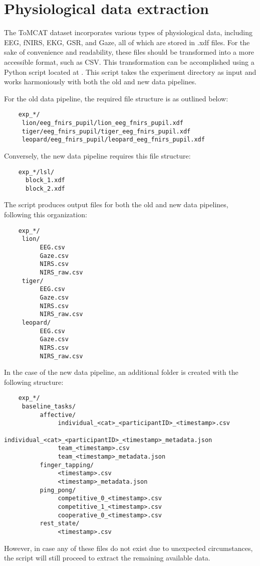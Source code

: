 \section{Physiological data extraction}
The ToMCAT dataset incorporates various types of physiological data, including EEG, fNIRS, EKG, GSR, and Gaze, all of which are stored in .xdf files. For the sake of convenience and readability, these files should be transformed into a more accessible format, such as CSV. This transformation can be accomplished using a Python script located at  . This script takes the experiment directory as input and works harmoniously with both the old and new data pipelines.

For the old data pipeline, the required file structure is as outlined below:
\begin{verbatim}
    exp_*/
     lion/eeg_fnirs_pupil/lion_eeg_fnirs_pupil.xdf
     tiger/eeg_fnirs_pupil/tiger_eeg_fnirs_pupil.xdf
     leopard/eeg_fnirs_pupil/leopard_eeg_fnirs_pupil.xdf
\end{verbatim}

Conversely, the new data pipeline requires this file structure:
\begin{verbatim}
    exp_*/lsl/
      block_1.xdf
      block_2.xdf
\end{verbatim}

The script produces output files for both the old and new data pipelines, following this organization:
\begin{verbatim}
    exp_*/
     lion/
          EEG.csv
          Gaze.csv
          NIRS.csv
          NIRS_raw.csv
     tiger/
          EEG.csv
          Gaze.csv
          NIRS.csv
          NIRS_raw.csv
     leopard/
          EEG.csv
          Gaze.csv
          NIRS.csv
          NIRS_raw.csv

\end{verbatim}
In the case of the new data pipeline, an additional folder is created with the following structure:
\begin{verbatim}
    exp_*/
     baseline_tasks/
          affective/
               individual_<cat>_<participantID>_<timestamp>.csv
               individual_<cat>_<participantID>_<timestamp>_metadata.json
               team_<timestamp>.csv
               team_<timestamp>_metadata.json
          finger_tapping/
               <timestamp>.csv
               <timestamp>_metadata.json
          ping_pong/
               competitive_0_<timestamp>.csv
               competitive_1_<timestamp>.csv
               cooperative_0_<timestamp>.csv
          rest_state/
               <timestamp>.csv

\end{verbatim}

However, in case any of these files do not exist due to unexpected circumstances, the script will still proceed to extract the remaining available data.
